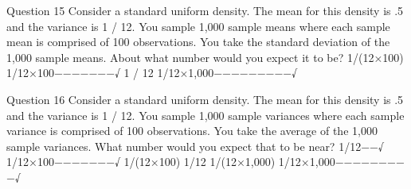Question 15
Consider a standard uniform density. The mean for this density is .5 and the variance is 1 / 12. You sample 1,000 sample means where each sample mean is comprised of 100 observations. You take the standard deviation of the 1,000 sample means. About what number would you expect it to be?
1/(12×100)
1/12×100−−−−−−−√
1 / 12
1/12×1,000−−−−−−−−−√


Question 16
Consider a standard uniform density. The mean for this density is .5 and the variance is 1 / 12. You sample 1,000 sample variances where each sample variance is comprised of 100 observations. You take the average of the 1,000 sample variances. What number would you expect that to be near?
1/12−−√
1/12×100−−−−−−−√
1/(12×100)
1/12
1/(12×1,000)
1/12×1,000−−−−−−−−−√
